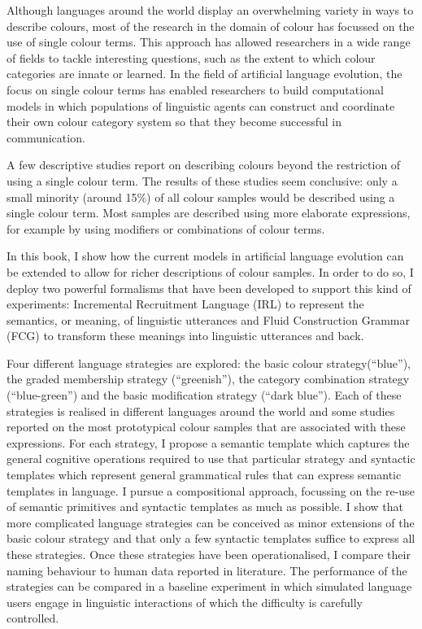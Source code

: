 
Although languages around the world display an overwhelming variety in
ways to describe colours, most of the research in the domain of colour
has focussed on the use of single colour terms. This approach has
allowed researchers in a wide range of fields to tackle interesting
questions, such as the extent to which colour categories are innate or
learned. In the field of artificial language evolution, the focus on
single colour terms has enabled researchers to build computational
models in which populations of linguistic agents can construct and
coordinate their own colour category system so that they become
successful in communication.

A few descriptive studies report on describing colours beyond the
restriction of using a single colour term. The results of these
studies seem conclusive: only a small minority (around 15\%) of all
colour samples would be described using a single colour term. Most
samples are described using more elaborate expressions, for example by
using modifiers or combinations of colour terms.

In this book, I show how the current models in artificial language
evolution can be extended to allow for richer descriptions of colour
samples. In order to do so, I deploy two powerful formalisms that have
been developed to support this kind of experiments: Incremental
Recruitment Language (IRL) to represent the semantics, or meaning, of
linguistic utterances and Fluid Construction Grammar (FCG) to
transform these meanings into linguistic utterances and back.

Four different language strategies are explored: the basic colour
strategy\linebreak (``blue''), the graded membership strategy (``greenish''),
the category combination strategy (``blue-green'') and the basic
modification strategy (``dark blue''). Each of these strategies is
realised in different languages around the world and some studies
reported on the most prototypical colour samples that are associated
with these expressions. For each strategy, I propose a semantic
template which captures the general cognitive operations required to
use that particular strategy and syntactic templates which represent
general grammatical rules that can express semantic templates in
language. I pursue a compositional approach, focussing on the re-use
of semantic primitives and syntactic templates as much as possible. I
show that more complicated language strategies can be conceived as
minor extensions of the basic colour strategy and that only a few
syntactic templates suffice to express all these strategies. Once
these strategies have been operationalised, I compare their naming
behaviour to human data reported in literature. The performance of the
strategies can be compared in a baseline experiment in which simulated
language users engage in linguistic interactions of which the
difficulty is carefully controlled.

